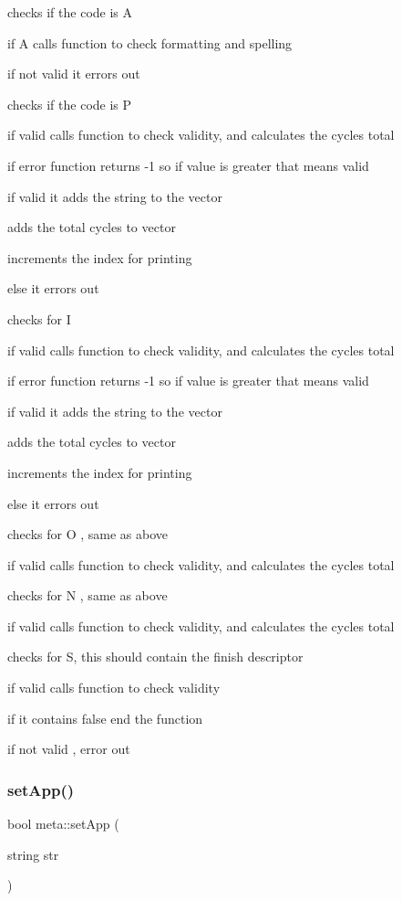 checks if the code is \textquotesingle{}A\textquotesingle{}

if \textquotesingle{}A\textquotesingle{} calls function to check formatting and spelling

if not valid it errors out

checks if the code is \textquotesingle{}P\textquotesingle{}

if valid calls function to check validity, and calculates the cycles total

if error function returns -\/1 so if value is greater that means valid

if valid it adds the string to the vector

adds the total cycles to vector

increments the index for printing

else it errors out

checks for \textquotesingle{}I\textquotesingle{}

if valid calls function to check validity, and calculates the cycles total

if error function returns -\/1 so if value is greater that means valid

if valid it adds the string to the vector

adds the total cycles to vector

increments the index for printing

else it errors out

checks for \textquotesingle{}O\textquotesingle{} , same as above

if valid calls function to check validity, and calculates the cycles total

checks for \textquotesingle{}N\textquotesingle{} , same as above

if valid calls function to check validity, and calculates the cycles total

checks for \textquotesingle{}S\textquotesingle{}, this should contain the finish descriptor

if valid calls function to check validity

if it contains false end the function

if not valid , error out \mbox{\label{classmeta_a63b659832069e195bb2013b63dd9b4e7}} 
\subsubsection{\texorpdfstring{setApp()}{setApp()}}
{\footnotesize\ttfamily bool meta\+::set\+App (\begin{DoxyParamCaption}\item[{string}]{str }\end{DoxyParamCaption})}



